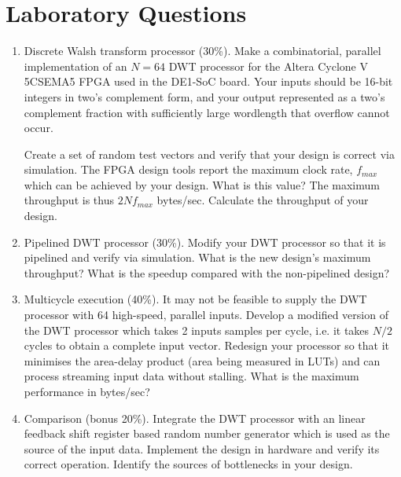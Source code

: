 \section{Laboratory Questions}
\begin{enumerate}
\item Discrete Walsh transform processor (30\%). 
Make a combinatorial, parallel implementation of an $N=64$ DWT processor
for the Altera Cyclone V 5CSEMA5 FPGA used in the DE1-SoC board.
Your inputs should be 16-bit integers in two's complement form, and
your output represented as a two's complement fraction with sufficiently
large wordlength that overflow cannot occur. 

Create a set of random test vectors and verify that your design is
correct via simulation. The FPGA design tools report the maximum
clock rate, $f_{max}$ which can be achieved by your design. What is this
value? The 
maximum throughput is thus $2Nf_{max}$ bytes/sec. Calculate the
throughput of your design.

\item Pipelined DWT processor (30\%). 
Modify your DWT processor so that it is pipelined and verify via
simulation. What is the new design's
maximum throughput? What is the speedup compared with the non-pipelined design?

\item Multicycle execution (40\%). 
It may not be feasible to supply the DWT processor with 64 high-speed,
parallel inputs. Develop a modified version of the DWT processor
which takes 2 inputs samples per cycle, i.e. it takes $N/2$ cycles
to obtain a complete input vector. Redesign your processor
so that it minimises the area-delay product (area being measured in
LUTs) and can process streaming input data without stalling.
What is the maximum performance in bytes/sec?

\item Comparison (bonus 20\%). 
Integrate the DWT processor with an linear feedback shift register based
random number generator which is used as the source of the input
data. Implement the design in hardware and verify its correct operation.
Identify the sources of bottlenecks in your design.

\end{enumerate}

